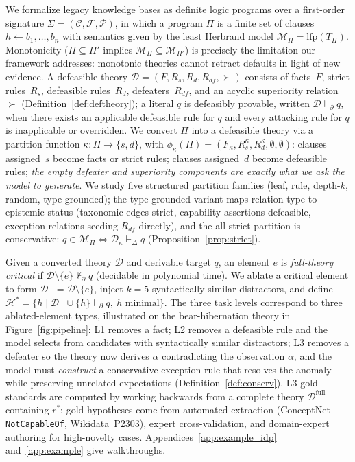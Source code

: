 \documentclass{article}
\theoremstyle{definition}
\newcommand{\D}{\mathcal{D}}
\newcommand{\Dm}{\mathcal{D}^{-}}
\newcommand{\Dfull}{\mathcal{D}^{\mathrm{full}}}
\newcommand{\Hgold}{\mathcal{H}^{*}}
\newcommand{\Rs}{R_s}
\newcommand{\Rd}{R_d}
\newcommand{\Rdf}{R_{df}}
\newcommand{\partfunc}{\kappa}
\newcommand{\pDelta}{\vdash_{\Delta}}
\newcommand{\pPartial}{\vdash_{\partial}}
\newcommand{\comp}[1]{\overline{#1}}
\begin{document}
We formalize legacy knowledge bases as definite logic programs over a first-order signature $\Sigma = (\mathcal{C}, \mathcal{F}, \mathcal{P})$, in which a program $\Pi$ is a finite set of clauses $h \leftarrow b_1, \ldots, b_n$ with semantics given by the least Herbrand model $\mathcal{M}_\Pi = \mathrm{lfp}(T_\Pi)$. Monotonicity ($\Pi \subseteq \Pi'$ implies $\mathcal{M}_\Pi \subseteq \mathcal{M}_{\Pi'}$) is precisely the limitation our framework addresses: monotonic theories cannot retract defaults in light of new evidence. A defeasible theory $\D = (F, \Rs, \Rd, \Rdf, {\succ})$ consists of facts~$F$, strict rules~$\Rs$, defeasible rules~$\Rd$, defeaters~$\Rdf$, and an acyclic superiority relation~$\succ$ (Definition~\ref{def:deftheory}); a literal $q$ is defeasibly provable, written $\D \pPartial q$, when there exists an applicable defeasible rule for $q$ and every attacking rule for $\comp{q}$ is inapplicable or overridden. We convert $\Pi$ into a defeasible theory via a partition function $\partfunc: \Pi \to \{s, d\}$, with $\phi_\partfunc(\Pi) = (F_\partfunc, \Rs^{\partfunc}, \Rd^{\partfunc}, \emptyset, \emptyset)$: clauses assigned~$s$ become facts or strict rules; clauses assigned~$d$ become defeasible rules; \emph{the empty defeater and superiority components are exactly what we ask the model to generate}. We study five structured partition families (leaf, rule, depth-$k$, random, type-grounded); the type-grounded variant maps relation type to epistemic status (taxonomic edges strict, capability assertions defeasible, exception relations seeding $\Rdf$ directly), and the all-strict partition is conservative: $q \in \mathcal{M}_\Pi \iff \D_\partfunc \pDelta q$ (Proposition~\ref{prop:strict}).

Given a converted theory $\D$ and derivable target $q$, an element $e$ is \emph{full-theory critical} if $\D \setminus \{e\} \not\pPartial q$ (decidable in polynomial time). We ablate a critical element to form $\Dm = \D \setminus \{e\}$, inject $k = 5$ syntactically similar distractors, and define $\Hgold = \{h \mid \Dm \cup \{h\} \pPartial q,\ h \text{ minimal}\}$. The three task levels correspond to three ablated-element types, illustrated on the bear-hibernation theory in Figure~\ref{fig:pipeline}: L1 removes a fact; L2 removes a defeasible rule and the model selects from candidates with syntactically similar distractors; L3 removes a defeater so the theory now derives $\comp{\alpha}$ contradicting the observation $\alpha$, and the model must \emph{construct} a conservative exception rule that resolves the anomaly while preserving unrelated expectations (Definition~\ref{def:conserv}). L3 gold standards are computed by working backwards from a complete theory $\Dfull$ containing $r^*$; gold hypotheses come from automated extraction (ConceptNet \texttt{NotCapableOf}, Wikidata~P2303), expert cross-validation, and domain-expert authoring for high-novelty cases. Appendices~\ref{app:example_idp} and~\ref{app:example} give walkthroughs.
\end{document}

